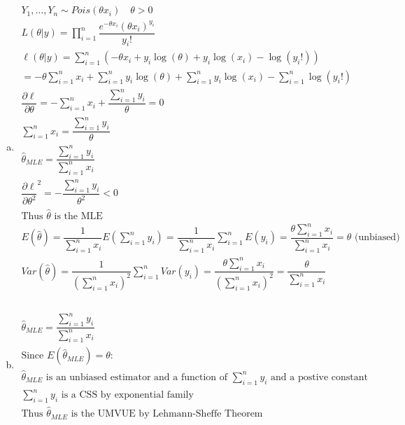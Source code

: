 \documentclass{article}
\newcommand{\sumn}{\sum_{i=1}^{n}}
\newcommand{\hth}{\hat{\theta}}
\newcommand{\prodn}{\prod_{i=1}^{n}}
\newcommand{\dll}[1]{\dfrac{\partial\ell}{\partial{#1}}}
\newcommand{\mle}{\hat{\theta}_{MLE}}
\newcommand{\sumx}{\sum_{i=1}^{n}x_i}
\newcommand{\ta}{\theta}
\begin{document}
\begin{flushleft}
\begin{enumerate}[(a)]
	\item 	
\begin{multline*}\\
Y_1,\dots, Y_n \sim Pois(\ta x_i) \quad \ta>0\\
L(\ta|y)=\prodn \dfrac{e^{-\ta x_i}(\ta x_i)^{y_i}}{y_i!}\\
\ell(\ta|y)=\sumn \left(-\ta x_i+y_i\log(\ta) +y_i\log(x_i)-\log(y_i!)\right)\\
=-\ta\sumx+\sumn y_i\log(\ta)+\sumn y_i\log(x_i) -\sumn \log(y_i!)\\
\dll{\ta}=-\sumx+\dfrac{\sumn y_i}{\ta}=0\\
\sumx=\dfrac{\sumn y_i}{\ta}\\
\mle=\dfrac{\sumn y_i}{\sumx}\\
\dll{\ta^2}^2=-\dfrac{\sumn y_i}{\ta^2}<0\\
\text{Thus } \hth \text{ is the MLE}\\
E(\hth)=\dfrac{1}{\sumx}E(\sumn y_i)=\dfrac{1}{\sumx}\sumn E(y_i)=\dfrac{\ta\sumx}{\sumx}=\ta \text{ (unbiased)}\\
Var(\hth)=\dfrac{1}{(\sumx)^2}\sumn Var(y_i)=\dfrac{\ta \sumx}{(\sumx)^2}=\dfrac{\ta}{\sumx}\\
\end{multline*}

	\item 
\begin{multline*}\\
\mle=\dfrac{\sumn y_i}{\sumx}\\
\text{Since } E(\mle)=\ta:\\
\mle \text{ is an unbiased estimator and a function of } \sumn y_i \text{ and a postive constant}\\
\sumn y_i \text{ is a CSS by exponential family}\\
\text{Thus } \mle \text{ is the UMVUE by Lehmann-Sheffe Theorem}\\
\end{multline*}


\end{enumerate}
\end{flushleft}
\end{document}

